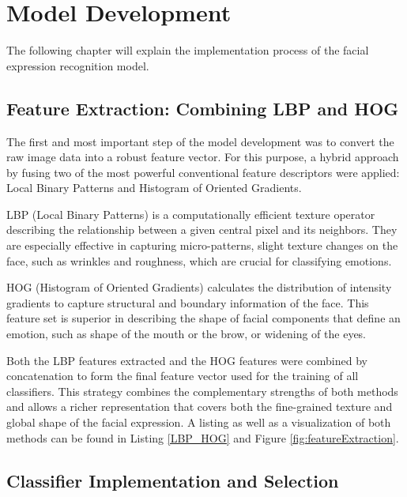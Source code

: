 \chapter{Model Development}

The following chapter will explain the implementation process of the facial expression recognition model.
\newline

\section{Feature Extraction: Combining LBP and HOG}

The first and most important step of the model development was to convert the raw image data into a robust feature vector. For this purpose, a hybrid approach by fusing two of the most powerful conventional feature descriptors were applied: Local Binary Patterns and Histogram of Oriented Gradients.

LBP (Local Binary Patterns) is a computationally efficient texture operator describing the relationship between a given central pixel and its neighbors. They are especially effective in capturing micro-patterns, slight texture changes on the face, such as wrinkles and roughness, which are crucial for classifying emotions.

HOG (Histogram of Oriented Gradients) calculates the distribution of intensity gradients to capture structural and boundary information of the face. This feature set is superior in describing the shape of facial components that define an emotion, such as shape of the mouth or the brow, or widening of the eyes.

Both the LBP features extracted and the HOG features were combined by concatenation to form the final feature vector used for the training of all classifiers. This strategy combines the complementary strengths of both methods and allows a richer representation that covers both the fine-grained texture and global shape of the facial expression. A listing as well as a visualization of both methods can be found in Listing \ref{LBP_HOG} and Figure \ref{fig:featureExtraction}.
\newline

\section{Classifier Implementation and Selection}

